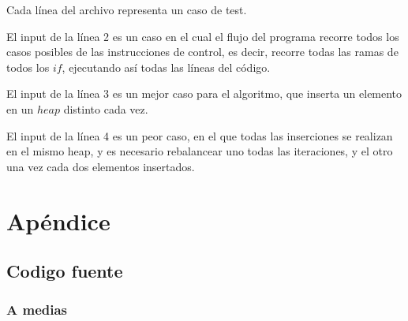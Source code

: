 \documentclass[spanish,a4paper]{article}
\begin{document}
Cada línea del archivo representa un caso de test.

El input de la línea 2 es un caso en el cual el flujo del programa recorre todos los casos posibles de las instrucciones de control, es decir, recorre todas las ramas de todos los $if$, ejecutando así todas las líneas del código.

El input de la línea 3 es un mejor caso para el algoritmo, que inserta un elemento en un $heap$ distinto cada vez.

El input de la línea 4 es un peor caso, en el que todas las inserciones se realizan en el mismo heap, y es necesario rebalancear uno todas las iteraciones, y el otro una vez cada dos elementos insertados.

\section{Apéndice}

\subsection{Codigo fuente}

\newpage
\subsubsection{A medias}

\newpage
\end{document}
